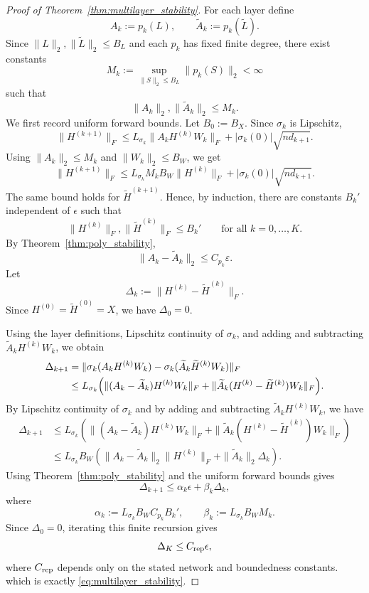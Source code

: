 \documentclass{article}
\begin{document}
\begin{proof}[Proof of Theorem~\ref{thm:multilayer_stability}]
For each layer define
\[
A_k := p_k(L),
\qquad
\widetilde A_k := p_k(\widetilde L).
\]
Since $\|L\|_2,\|\widetilde L\|_2\le B_L$ and each $p_k$ has fixed finite degree, there exist constants
\[
M_k := \sup_{\|S\|_2\le B_L}\|p_k(S)\|_2 < \infty
\]
such that
\[
\|A_k\|_2,\|\widetilde A_k\|_2 \le M_k .
\]
We first record uniform forward bounds. Let $B_0:=B_X$. Since $\sigma_k$ is Lipschitz,
\[
\|H^{(k+1)}\|_F
\le
L_{\sigma_k}\|A_k H^{(k)}W_k\|_F
+
|\sigma_k(0)|\sqrt{n d_{k+1}} .
\]
Using $\|A_k\|_2\le M_k$ and $\|W_k\|_2\le B_W$, we get
\[
\|H^{(k+1)}\|_F
\le
L_{\sigma_k}M_k B_W \|H^{(k)}\|_F
+
|\sigma_k(0)|\sqrt{n d_{k+1}} .
\]
The same bound holds for $\widetilde H^{(k+1)}$. Hence, by induction, there are constants
$B_k'$ independent of $\epsilon$ such that
\[
\|H^{(k)}\|_F,\|\widetilde H^{(k)}\|_F\le B_k'
\qquad
\text{for all }k=0,\ldots,K .
\]
By Theorem~\ref{thm:poly_stability},
\[
\|A_k-\widetilde A_k\|_2 \le C_{p_k}\varepsilon.
\]
Let
\[
\Delta_k := \|H^{(k)}-\widetilde H^{(k)}\|_F.
\]
Since $H^{(0)}=\widetilde H^{(0)}=X$, we have $\Delta_0=0$.

Using the layer definitions, Lipschitz continuity of $\sigma_k$, and adding and subtracting $\widetilde A_k H^{(k)}W_k$, we obtain
\begin{align}
\Delta_{k+1}
&= \|\sigma_k(A_k H^{(k)}W_k)-\sigma_k(\widetilde A_k \widetilde H^{(k)}W_k)\|_F \notag\\
&\le L_{\sigma_k}\Bigl(
\|(A_k-\widetilde A_k)H^{(k)}W_k\|_F
+
\|\widetilde A_k(H^{(k)}-\widetilde H^{(k)})W_k\|_F
\Bigr).
\label{eq:delta_recursion_step}
\end{align}
By Lipschitz continuity of $\sigma_k$ and by adding and subtracting
$\widetilde A_k H^{(k)}W_k$, we have
\[
\begin{aligned}
\Delta_{k+1}
&\le
L_{\sigma_k}
\left(
\|(A_k-\widetilde A_k)H^{(k)}W_k\|_F
+
\|\widetilde A_k(H^{(k)}-\widetilde H^{(k)})W_k\|_F
\right)  \\
&\le
L_{\sigma_k}B_W
\left(
\|A_k-\widetilde A_k\|_2 \|H^{(k)}\|_F
+
\|\widetilde A_k\|_2 \Delta_k
\right).
\end{aligned}
\]
Using Theorem~\ref{thm:poly_stability} and the uniform forward bounds gives
\[
\Delta_{k+1}\le \alpha_k\epsilon+\beta_k\Delta_k ,
\]
where
\[
\alpha_k := L_{\sigma_k}B_W C_{p_k}B_k',
\qquad
\beta_k := L_{\sigma_k}B_W M_k .
\]
Since $\Delta_0=0$, iterating this finite recursion gives
\[
\Delta_K\le C_{\rm rep}\epsilon ,
\]
where $C_{\rm rep}$ depends only on the stated network and boundedness constants.
which is exactly \eqref{eq:multilayer_stability}.
\end{proof}
\end{document}

